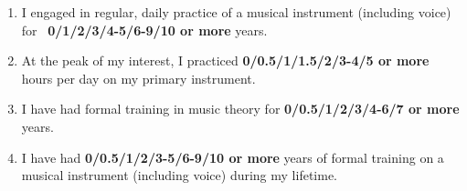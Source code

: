 \documentclass[12pt, a4paper]{article}
\begin{document}
\begin{enumerate}
\item I engaged in regular, daily practice of a musical instrument (including voice) for \
\newline\textbf{0\hspace{2pt}/\hspace{2pt}1\hspace{2pt}/\hspace{2pt}2\hspace{2pt}/\hspace{2pt}3\hspace{2pt}/\hspace{2pt}4-5\hspace{2pt}/\hspace{2pt}6-9\hspace{2pt}/\hspace{2pt}10 or more} years.
\item At the peak of my interest, I practiced \textbf{0\hspace{2pt}/\hspace{2pt}0.5\hspace{2pt}/\hspace{2pt}1\hspace{2pt}/\hspace{2pt}1.5\hspace{2pt}/\hspace{2pt}2\hspace{2pt}/\hspace{2pt}3-4\hspace{2pt}/\hspace{2pt}5 or more}
hours per day on my primary instrument.
\item I have had formal training in music theory for \textbf{0\hspace{2pt}/\hspace{2pt}0.5\hspace{2pt}/\hspace{2pt}1\hspace{2pt}/\hspace{2pt}2\hspace{2pt}/\hspace{2pt}3\hspace{2pt}/\hspace{2pt}4-6\hspace{2pt}/\hspace{2pt}7 or more} years.
\item I have had \textbf{0\hspace{2pt}/\hspace{2pt}0.5\hspace{2pt}/\hspace{2pt}1\hspace{2pt}/\hspace{2pt}2\hspace{2pt}/\hspace{2pt}3-5\hspace{2pt}/\hspace{2pt}6-9\hspace{2pt}/\hspace{2pt}10 or more} years of formal training on a musical instrument (including voice) during my lifetime.

\end{enumerate}
\end{document}
